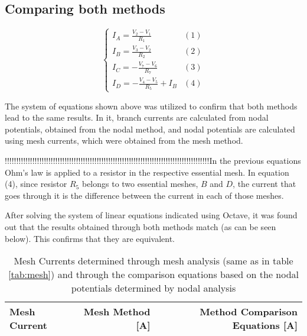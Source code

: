 \subsection{Comparing both methods}
\label{sec:comparison}
\par

\begin{equation}
\begin{cases}
I_A= \frac{V_2-V_1}{R_1} & \mbox{$(1)$}\\
I_B= \frac{V_3-V_2}{R_2} & \mbox{$(2)$}\\
I_C= -\frac{V_7-V_6}{R_7} & \mbox{$(3)$}\\
I_D= -\frac{V_4-V_5}{R_5} +I_B & \mbox{$(4)$}
\end{cases}
\end{equation}

The system of equations shown above was utilized to confirm that both methods lead to the same results. In it, branch currents are calculated from nodal potentials, obtained from the nodal method, and nodal potentials are calculated using mesh currents, which were obtained from the mesh method.


\par
!!!!!!!!!!!!!!!!!!!!!!!!!!!!!!!!!!!!!!!!!!!!!!!!!!!!!!!!!!!!!!!!!!!!!!!!!!!!!!!!!!!!!!!!!In the previous equations Ohm's law is applied to a resistor in the respective essential mesh. In equation (4), since resistor $R_5$ belongs to two essential meshes, $B$ and $D$, the current that goes through it is the difference between the current in each of those meshes.

\par
After solving the system of linear equations indicated using Octave, it was found out that the results obtained through both methods match (as can be seen below). This confirms that they are equivalent.

\begin{table}[hbt!]
  \centering
  \begin{tabular}{|l|r|r|}
    \hline    
    {\bf Mesh Current} & {\bf Mesh Method [A]} & {\bf Method Comparison Equations [A]} \\ \hline
    
  \end{tabular}
  \caption{Mesh Currents determined through mesh analysis (same as in table \ref{tab:mesh}) and through the comparison equations based on the nodal potentials determined by nodal analysis}
  \label{tab:comp}
\end{table}
